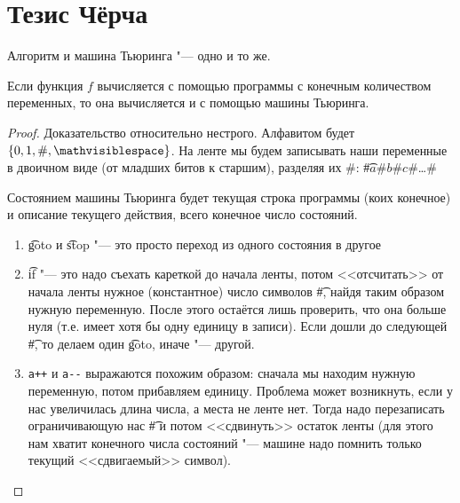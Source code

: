 \section{Тезис Чёрча}

Алгоритм и машина Тьюринга "--- одно и то же.

\begin{theorem}
	Если функция $f$ вычисляется с помощью программы с конечным количеством переменных, то она вычисляется и с помощью машины Тьюринга.
\end{theorem}
\begin{proof}
	Доказательство относительно нестрого.
	Алфавитом будет $\{0, 1, \#, \mathvisiblespace\}$.
	На ленте мы будем записывать наши переменные в двоичном виде (от младших битов к старшим), разделяя их $\#$:
	\t{\#$a$\#$b$\#$c$\#\dots\#}

	Состоянием машины Тьюринга будет текущая строка программы (коих конечное) и описание текущего действия, всего конечное число состояний.
	\begin{enumerate}
		\item \t{goto} и \t{stop} "--- это просто переход из одного состояния в другое
		\item
			\t{if} "--- это надо съехать кареткой до начала ленты, потом <<отсчитать>> от начала ленты нужное (константное) число символов \t{\#}, найдя таким образом нужную переменную.
			После этого остаётся лишь проверить, что она больше нуля (т.е. имеет хотя бы одну единицу в записи).
			Если дошли до следующей \t{\#}, то делаем один \t{goto}, иначе "--- другой.
		\item
			\verb'a++' и \verb'a--' выражаются похожим образом: сначала мы находим нужную переменную, потом прибавляем единицу.
			Проблема может возникнуть, если у нас увеличилась длина числа, а места не ленте нет.
			Тогда надо перезаписать ограничивающую нас \t{\#} и потом <<сдвинуть>> остаток ленты (для этого нам хватит конечного числа состояний "--- машине надо помнить только текущий <<сдвигаемый>> символ).
	\end{enumerate}
\end{proof}

